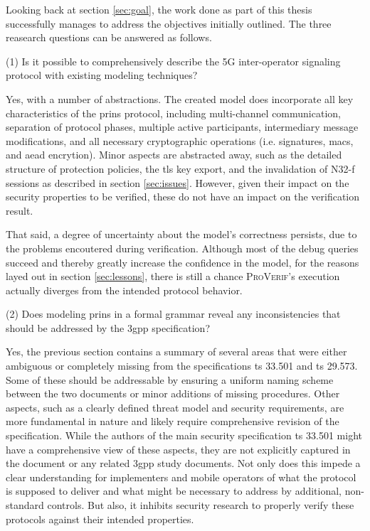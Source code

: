 Looking back at section \ref{sec:goal}, the work done as part of this thesis successfully manages to address the objectives initially outlined.
The three reasearch questions can be answered as follows.\bigskip

\noindent
(1) Is it possible to comprehensively describe the 5G inter-operator signaling protocol with existing modeling techniques?

Yes, with a number of abstractions.
The created model does incorporate all key characteristics of the \gls{prins} protocol, including multi-channel communication, separation of protocol phases, multiple active participants, intermediary message modifications, and all necessary cryptographic operations (i.e. signatures, \glspl{mac}, and \gls{aead} encrytion).
Minor aspects are abstracted away, such as the detailed structure of protection policies, the \gls{tls} key export, and the invalidation of N32-f sessions as described in section \ref{sec:issues}.
However, given their impact on the security properties to be verified, these do not have an impact on the verification result.

That said, a degree of uncertainty about the model's correctness persists, due to the problems encoutered during verification.
Although most of the debug queries succeed and thereby greatly increase the confidence in the model, for the reasons layed out in section \ref{sec:lessons}, there is still a chance \textsc{ProVerif}'s execution actually diverges from the intended protocol behavior.\bigskip

\noindent
(2) Does modeling \gls{prins} in a formal grammar reveal any inconsistencies that should be addressed by the \gls{3gpp} specification?

Yes, the previous section contains a summary of several areas that were either ambiguous or completely missing from the specifications \gls{ts} 33.501 and \gls{ts} 29.573.
Some of these should be addressable by ensuring a uniform naming scheme between the two documents or minor additions of missing procedures.
Other aspects, such as a clearly defined threat model and security requirements, are more fundamental in nature and likely require comprehensive revision of the specification.
While the authors of the main security specification \gls{ts} 33.501 might have a comprehensive view of these aspects, they are not explicitly captured in the document or any related \gls{3gpp} study documents.
Not only does this impede a clear understanding for implementers and mobile operators of what the protocol is supposed to deliver and what might be necessary to address by additional, non-standard controls.
But also, it inhibits security research to properly verify these protocols against their intended properties.

